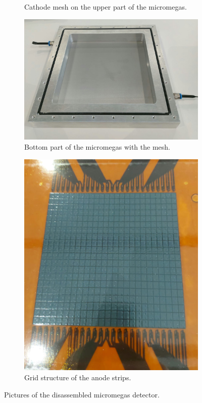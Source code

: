 \documentclass[sn-mathphys-num,iicol]{sn-jnl}
\theoremstyle{thmstyleone}
\theoremstyle{thmstyletwo}
\theoremstyle{thmstylethree}
\begin{document}
\begin{figure}[h]
\begin{subfigure}{0.51\textwidth}
        \caption{Cathode mesh on the upper part of the micromegas.}
        \label{fig:micromegas_cover}
    \end{subfigure}
    \begin{subfigure}{0.62\textwidth}
      \includegraphics[width=\linewidth]{figures/micromegas_base_top.jpeg}
      \caption{Bottom part of the micromegas with the mesh.}
      \label{fig:micromegas_base}
    \end{subfigure}
    \begin{subfigure}{0.36\textwidth}
        \includegraphics[width=\linewidth]{figures/micromegas_strips.jpeg}
        \caption{Grid structure of the anode strips.}
        \label{fig:micromegas_strips}
    \end{subfigure}
    \caption{Pictures of the disassembled micromegas detector.}
    \label{fig:mircro_wow}
\end{figure}
\end{document}
